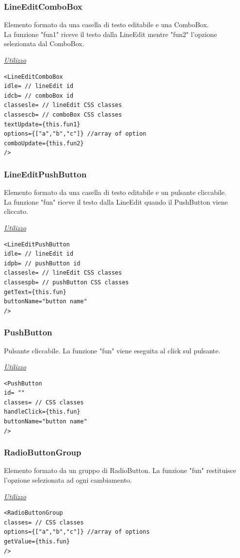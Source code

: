 \subsubsection{LineEditComboBox}
Elemento formato da una casella di testo editabile e una ComboBox.\\
La funzione "fun1" riceve il testo dalla LineEdit mentre "fun2" l'opzione selezionata dal ComboBox.
\begin{center}
\underline{\textit{Utilizzo}}
\begin{lstlisting}	
<LineEditComboBox
idle= // lineEdit id
idcb= // comboBox id
classesle= // lineEdit CSS classes
classescb= // comboBox CSS classes
textUpdate={this.fun1}
options={["a","b","c"]} //array of option
comboUpdate={this.fun2}
/>
\end{lstlisting}
\end{center}

\subsubsection{LineEditPushButton}
Elemento formato da una casella di testo editabile e un pulsante cliccabile.\\
La funzione "fun" riceve il testo dalla LineEdit quando il PushButton viene cliccato.
\begin{center}
\underline{\textit{Utilizzo}}
\begin{lstlisting}
<LineEditPushButton
idle= // lineEdit id
idpb= // pushButton id
classesle= // lineEdit CSS classes
classespb= // pushButton CSS classes
getText={this.fun}
buttonName="button name"
/>	
\end{lstlisting}
\end{center}

\subsubsection{PushButton}
Pulsante cliccabile. La funzione "fun" viene eseguita al click sul pulsante.
\begin{center}
\underline{\textit{Utilizzo}}
\begin{lstlisting}
<PushButton
id= ""
classes= // CSS classes
handleClick={this.fun}
buttonName="button name"
/>	
\end{lstlisting}
\end{center}

\subsubsection{RadioButtonGroup}
Elemento formato da un gruppo di RadioButton. La funzione "fun" restituisce l'opzione selezionata ad ogni cambiamento.
\begin{center}
\underline{\textit{Utilizzo}}
\begin{lstlisting}
<RadioButtonGroup
classes= // CSS classes
options={["a","b","c"]} //array of options
getValue={this.fun}
/>
\end{lstlisting}
\end{center}


